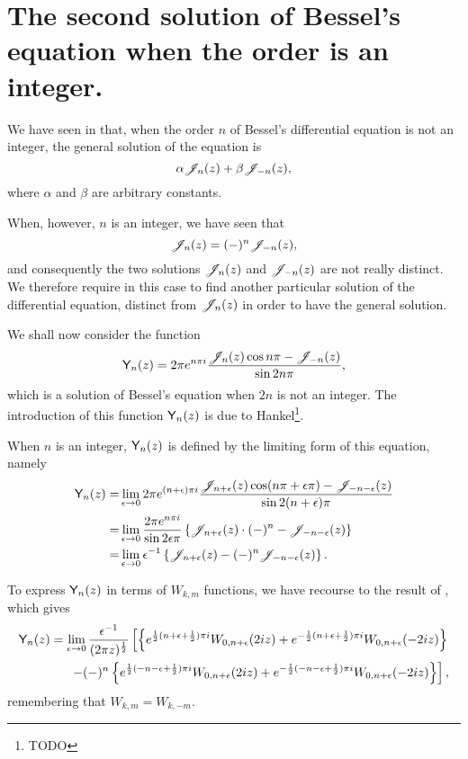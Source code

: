 \documentclass{book}
\begin{document}
\section{The second solution of Bessel's equation when the order
  is an integer.}
We have seen in  that, when the order $n$ of
Bessel's differential equation is not an integer, the general
solution of the equation is
$$
\alpha \mathscr{J}_n(z) + \beta \mathscr{J}_{-n}(z),
$$
where $\alpha$ and $\beta$ are arbitrary constants.

% 
% 
When, however, $n$ is an integer, we have seen that
$$
\mathscr{J}_n(z) = (-)^n \mathscr{J}_{-n}(z),
$$
and consequently the two solutions $\mathscr{J}_n(z)$ and $\mathscr{J}_{-n}(z)$ are
not really distinct. We therefore require in this case to find
another particular solution of the differential equation, distinct
from $\mathscr{J}_n(z)$ in order to have the general solution.

We shall now consider the function
$$
\mathsf{Y}_n(z)
=
2 \pi e^{n \pi i}
\frac{\mathscr{J}_n(z)\cos n\pi - \mathscr{J}_{-n}(z)}{\sin 2n\pi},
$$
which is a solution of Bessel's equation when $2n$ is not an
integer.
The introduction of this function $\mathsf{Y}_n(z)$ is due to
Hankel\footnote{TODO}.

When $n$ is an integer, $\mathsf{Y}_n(z)$ is defined by the limiting
form of this equation, namely
\begin{align*}
  \mathsf{Y}_n(z)
  =& \lim_{\epsilon\rightarrow 0}
  2\pi e^{(n+\epsilon)\pi i} \frac{ \mathscr{J}_{n+\epsilon}(z) \cos(n\pi+\epsilon\pi) -
    \mathscr{J}_{-n-\epsilon}(z)}{\sin 2(n+\epsilon)\pi}
  \\
  =& \lim_{\epsilon\rightarrow 0}
  \frac{2\pi e^{n\pi i}}{\sin 2\epsilon\pi}
  \left\{  \mathscr{J}_{n+\epsilon}(z) \cdot(-)^n - \mathscr{J}_{-n-\epsilon}(z) \right\}
  \\
  =&
  \lim_{\epsilon\rightarrow 0}
  \epsilon^{-1}
  \left\{  \mathscr{J}_{n+\epsilon}(z) - (-)^n \mathscr{J}_{-n-\epsilon}(z) \right\}.
\end{align*}

To express $\mathsf{Y}_n(z)$ in terms of $W_{k,m}$ functions, we have
recourse to the result of , which gives
\begin{align*}
  \mathsf{Y}_n(z)
  = \lim_{\epsilon\rightarrow 0}
  \frac{\epsilon^{-1}}{ (2\pi z)^{\frac{1}{2}}}
  \left[
    \left\{ 
      e^{\frac{1}{2}(n+\epsilon+\frac{1}{2})\pi i} W_{0,n+\epsilon}(2iz)
      + e^{-\frac{1}{2}(n+\epsilon+\frac{1}{2})\pi i} W_{0,n+\epsilon}(-2iz)
     \right\}
  \right.
  \\
  \left.
    - (-)^n
    \left\{ 
      e^{\frac{1}{2}(-n-\epsilon+\frac{1}{2})\pi i} W_{0,n+\epsilon}(2iz)
      + e^{-\frac{1}{2} (-n-\epsilon+\frac{1}{2})\pi i} W_{0,n+\epsilon}(-2iz)
     \right\}
  \right],
\end{align*}
remembering that $W_{k,m} = W_{k,-m}$.
\end{document}
